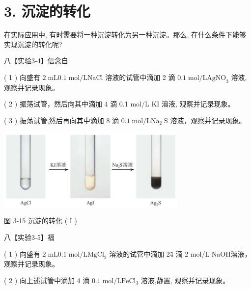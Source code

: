\documentclass[10pt]{article}
\begin{document}
\section*{3. 沉淀的转化}

在实际应用中, 有时需要将一种沉淀转化为另一种沉淀。那么, 在什么条件下能够实现沉淀的转化呢?

八【实验3-4】信念自

( 1 ) 向盛有 \(2\mathrm{\;{mL}}{0.1}\mathrm{\;{mol}}/\mathrm{L}\mathrm{{NaCl}}\) 溶液的试管中滴加 2 滴 \({0.1}\mathrm{\;{mol}}/\mathrm{L}{\mathrm{{AgNO}}}_{3}\) 溶液,观察并记录现象。

( 2 ) 振荡试管，然后向其中滴加 4 滴 0.1 mol/L KI 溶液, 观察并记录现象。

( 3 ) 振荡试管,然后再向其中滴加 8 滴 \({0.1}\mathrm{\;{mol}}/\mathrm{L}{\mathrm{{Na}}}_{2}\mathrm{\;S}\) 溶液，观察并记录现象。

\begin{center}
\end{center}

\begin{center}
\includegraphics[max width=0.7\textwidth]{images/0190da9d-8bfd-732f-bc2c-0b21d0f13b91_88_476150.jpg}
\end{center}

图 3-15 沉淀的转化 ( I )

八【实验3-5】福

( 1 ) 向盛有 \(2\mathrm{\;{mL}}{0.1}\mathrm{\;{mol}}/\mathrm{L}{\mathrm{{MgCl}}}_{2}\) 溶液的试管中滴加 2\~4 滴 2 mol/L NaOH溶液，观察并记录现象。

( 2 ) 向上述试管中滴加 4 滴 \({0.1}\mathrm{\;{mol}}/\mathrm{L}{\mathrm{{FeCl}}}_{3}\) 溶液,静置, 观察并记录现象。

\begin{center}
\end{center}
\end{document}
